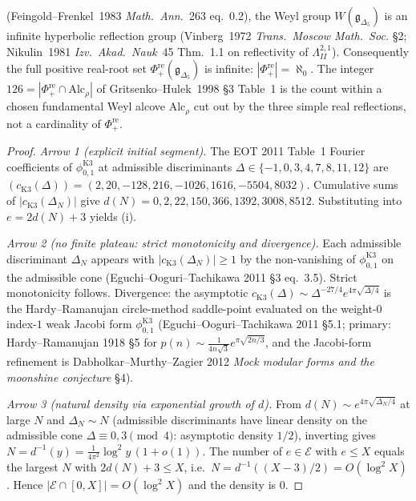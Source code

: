 \begin{theorem}
\begin{enumerate}[label=\textup{(\roman*)}]
 (Feingold--Frenkel~1983 \emph{Math.~Ann.}~263 eq.~0.2), the
 Weyl group $W(\mathfrak g_{\Delta_5})$ is an infinite hyperbolic
 reflection group (Vinberg~1972 \emph{Trans.~Moscow Math.~Soc.}
 \S2; Nikulin~1981 \emph{Izv.~Akad.~Nauk}~45 Thm.~1.1 on
 reflectivity of $\Lambda^{2,1}_{II}$). Consequently the full
 positive real-root set $\Phi^{\mathrm{re}}_+(\mathfrak g_{\Delta_5})$
 is infinite: $|\Phi^{\mathrm{re}}_+| = \aleph_0$. The integer
 $126 = |\Phi^{\mathrm{re}}_+\cap\mathrm{Alc}_\rho|$ of
 Gritsenko--Hulek~1998 \S3 Table~1 is the count within a
 chosen fundamental Weyl alcove $\mathrm{Alc}_\rho$ cut out by
 the three simple real reflections, not a cardinality of
 $\Phi^{\mathrm{re}}_+$.
\end{enumerate}
\end{theorem}

\begin{proof}
\emph{Arrow 1 (explicit initial segment).}
The EOT 2011 Table~1 Fourier coefficients of $\phi_{0,1}^{\mathrm K3}$
at admissible discriminants $\Delta\in\{-1, 0, 3, 4, 7, 8, 11, 12\}$
are
$(c_{\mathrm K3}(\Delta))
= (2, 20, -128, 216, -1026, 1616, -5504, 8032)$.
Cumulative sums of $|c_{\mathrm K3}(\Delta_N)|$ give
$d(N) = 0, 2, 22, 150, 366, 1392, 3008, 8512$.
Substituting into $e = 2d(N) + 3$ yields (i).

\emph{Arrow 2 (no finite plateau: strict monotonicity and divergence).}
Each admissible discriminant $\Delta_N$ appears with
$|c_{\mathrm K3}(\Delta_N)|\ge 1$ by the non-vanishing of
$\phi_{0,1}^{\mathrm K3}$ on the admissible cone (Eguchi--Ooguri--Tachikawa
2011 \S3 eq.~3.5). Strict monotonicity follows.
Divergence: the asymptotic
$c_{\mathrm K3}(\Delta)\sim\Delta^{-27/4}e^{4\pi\sqrt{\Delta/4}}$
is the Hardy--Ramanujan circle-method saddle-point evaluated on the
weight-$0$ index-$1$ weak Jacobi form $\phi_{0,1}^{\mathrm K3}$
(Eguchi--Ooguri--Tachikawa 2011 \S5.1; primary: Hardy--Ramanujan 1918
\S5 for $p(n)\sim\frac{1}{4n\sqrt 3}e^{\pi\sqrt{2n/3}}$, and the
Jacobi-form refinement is Dabholkar--Murthy--Zagier 2012
\emph{Mock modular forms and the moonshine conjecture} \S4).

\emph{Arrow 3 (natural density via exponential growth of $d$).}
From $d(N)\sim e^{4\pi\sqrt{\Delta_N/4}}$ at large $N$ and
$\Delta_N\sim N$ (admissible discriminants have linear density on the
admissible cone $\Delta\equiv 0, 3\pmod 4$: asymptotic density $1/2$),
inverting gives $N = d^{-1}(y) = \frac{1}{4\pi^2}\log^2 y\,(1+o(1))$.
The number of $e\in\mathcal E$ with $e\le X$ equals the largest $N$
with $2d(N) + 3\le X$, i.e.\ $N = d^{-1}((X-3)/2) = O(\log^2 X)$.
Hence $|\mathcal E\cap[0,X]| = O(\log^2 X)$ and the density is $0$.


\end{proof}
